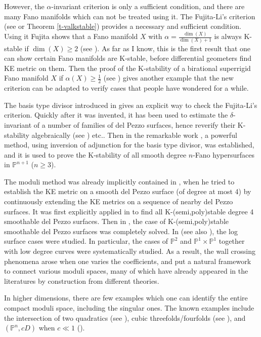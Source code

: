\documentclass[12pt,reqno]{amsart}%
\theoremstyle{definition}
\theoremstyle{remark}
\begin{document}
However, the $\alpha$-invariant criterion is only a sufficient condition, and there are many Fano manifolds which can not be treated using it.  The Fujita-Li's criterion (see \cite{Fuj19b, Li17} or Theorem \ref{t-valkstable}) provides a necessary and sufficient condition. Using it Fujita shows that a Fano manifold $X$ with $\alpha=\frac{\dim(X)}{\dim(X)+1}$ is always K-stable if $\dim(X)\ge 2$ (see \cite{Fuj19}). As far as I know, this is the first result that one can show certain Fano manifolds are K-stable, before differential geometers find KE metric on them. Then the proof of the K-stability of a birational superrigid Fano manifold $X$ if $\alpha(X)\ge\frac{1}{2}$ (see \cite{Zhu20b, SZ19}) gives another example that the new criterion can be adapted to verify cases that people have wondered for a while. 

The basis type divisor introduced in \cite{FO18} gives an explicit way to check the Fujita-Li's criterion. Quickly after it was invented, it has been used to estimate the $\delta$-invariant of a number of families of del Pezzo surfaces, hence reverify their K-stability algebraically (see \cites{PW18, CZ19}) etc.. Then in the remarkable work \cite{AZ20},  a powerful method, using inversion of adjunction for the basis type divisor,  was established, and it is used to prove the K-stability of all smooth degree $n$-Fano hypersurfaces in $\mathbb{P}^{n+1}$ ($n\ge 3$).

\smallskip

The moduli method was already implicitly contained in \cite{Tia90}, when he tried to establish the KE metric on a smooth del Pezzo surface (of degree at most 4) by continuously extending the KE metrics on a sequence of nearby del Pezzo surfaces. It was first explicitly applied in \cite{MM93} to find all K-(semi,poly)stable degree 4 smoothable del Pezzo surfaces. Then in \cite{OSS16}, the case of K-(semi,poly)stable smoothable del Pezzo surfaces was completely solved. In \cite{ADL19, ADL20} (see also \cite{GMS18}), the log surface cases were studied. In particular, the cases of $\mathbb{P}^2$ and $\mathbb P^1\times \mathbb P^1$ together with low degree curves were systematically studied. As a result, the wall crossing phenomena arose when one varies the coefficients, and put a natural framework to connect various moduli spaces, many of which have already appeared in the literatures by construction from different theories.  

In higher dimensions, there are few examples which one can identify the entire compact moduli space, including the singular ones. The known examples include the intersection of two quadratics (see \cite{SS17}), cubic threefolds/fourfolds (see \cite{LX19, Liu20}), and $(\mathbb{P}^n, cD)$ when $c\ll 1$ (\cite{ADL19}). 
\end{document}
